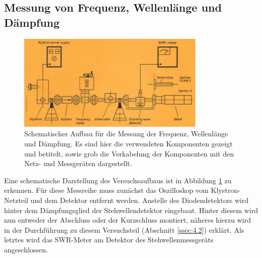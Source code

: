         \subsection{Messung von Frequenz, Wellenlänge und Dämpfung \label{ssec:3.2}}
        \begin{figure}[H]
            \centering
            \includegraphics[width=0.8\textwidth]{pics/v53_2.png}
            \caption{Schematischer Aufbau für die Messung der Frequenz, Wellenlänge und Dämpfung. Es sind hier die verwendeten Komponenten gezeigt und betitelt, sowie grob die Verkabelung der Komponenten mit den Netz- und Messgeräten dargestellt.\cite{Mikro}}
            \label{fig:4}
        \end{figure}
        Eine schematische Darstellung des Versuchsaufbaus ist in Abbildung \ref{fig:4} zu erkennen.
        Für diese Messreihe muss zunächst das Oszilloskop vom Klystron-Netzteil und dem Detektor entfernt werden.
        Anstelle des Diodendetektors wird hinter dem Dämpfungsglied der Stehwellendetektor eingebaut.
        Hinter diesem wird nun entweder der Abschluss oder der Kurzschluss montiert, näheres hierzu wird in der Durchführung zu diesem Versuchsteil (Abschnitt \ref{ssec:4.2}) erklärt.
        Als letztes wird das SWR-Meter am Detektor des Stehwellenmessgeräts angeschlossen.


